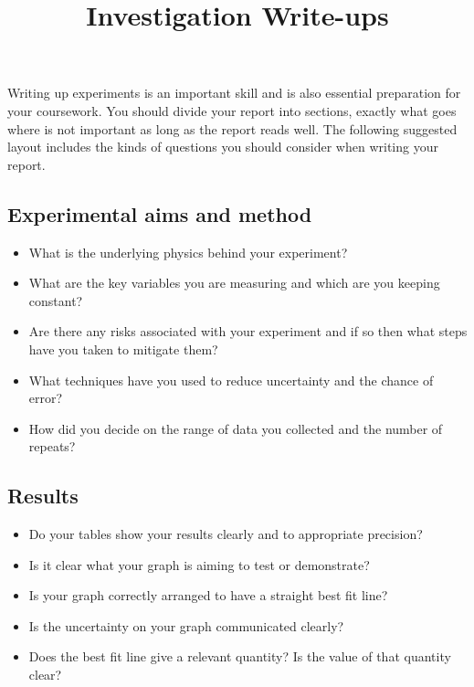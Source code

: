 \documentclass[a4paper]{article}
\title{Investigation Write-ups}
\date{}
\begin{document}
\maketitle \thispagestyle{fancy}
Writing up experiments is an important skill and is also essential preparation for your coursework. You should divide your report into sections, exactly what goes where is not important as long as the report reads well. The following suggested layout includes the kinds of questions you should consider when writing your report.

\subsection*{Experimental aims and method}
\begin{itemize}
    \item What is the underlying physics behind your experiment?
    \item What are the key variables you are measuring and which are you keeping constant?
    \item Are there any risks associated with your experiment and if so then what steps have you taken to mitigate them?
    \item What techniques have you used to reduce uncertainty and the chance of error?
    \item How did you decide on the range of data you collected and the number of repeats?
\end{itemize}

\subsection*{Results}
\begin{itemize}
    \item Do your tables show your results clearly and to appropriate precision?
    \item Is it clear what your graph is aiming to test or demonstrate?
    \item Is your graph correctly arranged to have a straight best fit line?
    \item Is the uncertainty on your graph communicated clearly?
    \item Does the best fit line give a relevant quantity?  Is the value of that quantity clear?
\end{itemize}
\end{document}
